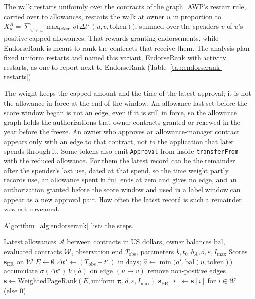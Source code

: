 The walk restarts uniformly over the contracts of the graph. AWP's restart rule, carried over to allowances, restarts the walk at owner $u$ in proportion to $X^A_u=\sum_{v\neq u}\max_{\mathrm{token}}\sigma\bigl(\Delta t^{\star}(u,v,\mathrm{token})\bigr)$, summed over the spenders $v$ of $u$'s positive capped allowances. That rewards granting endorsements, while EndorseRank is meant to rank the contracts that receive them. The analysis plan fixed uniform restarts and named this variant, EndorseRank with activity restarts, as one to report next to EndorseRank (Table~\ref{tab:endorserank-restarts}).

The weight keeps the capped amount and the time of the latest approval; it is not the allowance in force at the end of the window. An allowance last set before the score window began is not an edge, even if it is still in force, so the allowance graph holds the authorizations that owner contracts granted or renewed in the year before the freeze. An owner who approves an allowance-manager contract appears only with an edge to that contract, not to the application that later spends through it. Some tokens also emit \texttt{Approval} from inside \texttt{transferFrom} with the reduced allowance. For them the latest record can be the remainder after the spender's last use, dated at that spend, so the time weight partly records use, an allowance spent in full ends at zero and gives no edge, and an authorization granted before the score window and used in a label window can appear as a new approval pair. How often the latest record is such a remainder was not measured.

Algorithm~\ref{alg:endorserank} lists the steps.

\begin{algorithm}[htbp]
\caption{EndorseRank graph construction and scoring}
\label{alg:endorserank}
\begin{algorithmic}[1]
\Require Latest allowances $\mathcal{A}$ between contracts in US dollars, owner balances $\mathrm{bal}$, evaluated contracts $\mathcal{W}$, observation end $T_{\mathrm{obs}}$, parameters $k,t_0,b_A,d,\varepsilon,I_{\max}$
\Ensure Scores $\mathbf{s}_{\mathrm{ER}}$ on $\mathcal{W}$
\State $E \gets \emptyset$
  \State $\Delta t^{\star} \gets (T_{\mathrm{obs}}-t^{\star})$ in days; $\hat a \gets \min\bigl(a^{\star},\mathrm{bal}(u,\mathrm{token})\bigr)$
  \State accumulate $\sigma(\Delta t^{\star})\,V(\hat a)$ on edge $(u\to v)$ 
\EndFor
\State remove non-positive edges
\State $\mathbf{s} \gets \mathrm{WeightedPageRank}(E, \text{uniform }\boldsymbol{\pi}, d, \varepsilon, I_{\max})$ 
\State \Return $\mathbf{s}_{\mathrm{ER}}[i] \gets \mathbf{s}[i]$ for $i\in\mathcal{W}$ (else $0$)
\end{algorithmic}
\end{algorithm}

